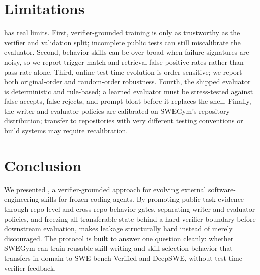 \section{Limitations}

\method{} has real limits. First, verifier-grounded training is only as
trustworthy as the verifier and validation split; incomplete public tests can
still miscalibrate the evaluator. Second, behavior skills can be over-broad
when failure signatures are noisy, so we report trigger-match and
retrieval-false-positive rates rather than pass rate alone. Third, online
test-time evolution is order-sensitive; we report both original-order and
random-order robustness. Fourth, the shipped evaluator is deterministic and
rule-based; a learned evaluator must be stress-tested against false accepts,
false rejects, and prompt bloat before it replaces the shell. Finally, the
writer and evaluator policies are calibrated on SWEGym's repository
distribution; transfer to repositories with very different testing
conventions or build systems may require recalibration.

\section{Conclusion}

We presented \method{}, a verifier-grounded approach for evolving external
software-engineering skills for frozen coding agents. By promoting public task
evidence through repo-level and cross-repo behavior gates, separating writer
and evaluator policies, and freezing all transferable state behind a hard
verifier boundary before downstream evaluation, \method{} makes leakage
structurally hard instead of merely discouraged. The protocol is built to answer
one question cleanly: whether SWEGym can train reusable skill-writing and
skill-selection behavior that transfers in-domain to SWE-bench Verified and
DeepSWE, without test-time verifier feedback.
